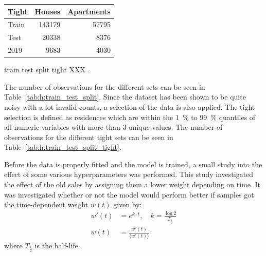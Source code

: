 \begin{margintable}
  \begin{tabular}{lrr}
   Tight      & Houses        & Apartments  \\ \midrule
   Train      & \num{143179}  & \num{57795} \\   
   Test       & \num{20338}   & \num{8376}  \\   
   \num{2019} & \num{9683}    & \num{4030} 
  \end{tabular}
  \vspace{3mm}
  \caption{\label{tab:h:train_test_split_tight}train test split tight XXX \TODO.}
  \vspace{3mm}
\end{margintable}

The number of observations for the different sets can be seen in Table~\ref{tab:h:train_test_split}. Since the dataset has been shown to be quite noisy with a lot invalid counts, a  selection of the data is also applied. The tight selection is defined as residences which are within the \SI{1}{\percent} to \SI{99}{\percent} quantiles of all numeric variables with more than 3 unique values. The number of observations for the different tight sets can be seen in Table~\ref{tab:h:train_test_split_tight}. 

Before the data is properly fitted and the model is trained, a small study into the effect of some various hyperparameters was performed. This study investigated the effect of the old sales by assigning them a lower weight depending on time. It was investigated whether or not the model would perform better if samples got the time-dependent weight $w(t)$ given by:
\begin{equation}
  \begin{split}
    w'(t) &= e^{ k \cdot t}, \quad k = \frac{\log 2}{T_{\frac{1}{2}}} \\
    w(t) &= \frac{w'(t)}{\langle w'(t) \rangle}
  \end{split}
\end{equation}
where $T_{\frac{1}{2}}$ is the half-life. 


